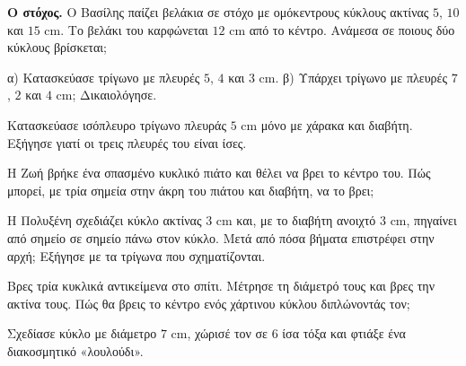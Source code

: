 \ex \textbf{Ο στόχος.} Ο Βασίλης παίζει βελάκια σε στόχο με ομόκεντρους κύκλους ακτίνας $5$, $10$ και $15$ cm. Το βελάκι του καρφώνεται $12$ cm από το κέντρο. Ανάμεσα σε ποιους δύο κύκλους βρίσκεται;


\ex α) Κατασκεύασε τρίγωνο με πλευρές $5$, $4$ και $3$ cm. β) Υπάρχει τρίγωνο με πλευρές $7$, $2$ και $4$ cm; Δικαιολόγησε.

\ex Κατασκεύασε ισόπλευρο τρίγωνο πλευράς $5$ cm μόνο με χάρακα και διαβήτη. Εξήγησε γιατί οι τρεις πλευρές του είναι ίσες.

\ex Η Ζωή βρήκε ένα σπασμένο κυκλικό πιάτο και θέλει να βρει το κέντρο του. Πώς μπορεί, με τρία σημεία στην άκρη του πιάτου και διαβήτη, να το βρει;

\ex Η Πολυξένη σχεδιάζει κύκλο ακτίνας $3$ cm και, με το διαβήτη ανοιχτό $3$ cm, πηγαίνει από σημείο σε σημείο πάνω στον κύκλο. Μετά από πόσα βήματα επιστρέφει στην αρχή; Εξήγησε με τα τρίγωνα που σχηματίζονται.


\ex Βρες τρία κυκλικά αντικείμενα στο σπίτι. Μέτρησε τη διάμετρό τους και βρες την ακτίνα τους. Πώς θα βρεις το κέντρο ενός χάρτινου κύκλου διπλώνοντάς τον;

\ex Σχεδίασε κύκλο με διάμετρο $7$ cm, χώρισέ τον σε $6$ ίσα τόξα και φτιάξε ένα διακοσμητικό «λουλούδι».
